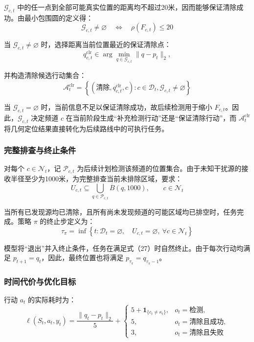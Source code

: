\(\mathcal G_{c,t}\) 中的任一点到全部可能真实位置的距离均不超过20米，因而能够保证清除成功。由最小包围圆的定义得：
\[
\mathcal G_{c,t}\ne\varnothing
\quad\Longleftrightarrow\quad
\rho(F_{c,t})\le20
\]

当 \(\mathcal G_{c,t}\ne\varnothing\) 时，选择距离当前位置最近的保证清除点：
\[
q_{c,t}^{\mathrm{clr}}
\in
\arg\min_{q\in\mathcal G_{c,t}}\|q-p_t\|_2,
\]

并构造清除候选行动集合：
\[
\mathcal A_t^{\mathrm{clr}}
=
\left\{
(\text{清除},q_{c,t}^{\mathrm{clr}},c):
c\in\mathcal D_t,
\mathcal G_{c,t}\ne\varnothing
\right\}
\tag{25}
\]

当 \(\mathcal G_{c,t}=\varnothing\) 时，当前信息不足以保证清除成功，故后续检测用于缩小 \(F_{c,t}\)。因此，\(\mathcal G_{c,t}\) 决定频道 \(c\) 在当前阶段生成``补充检测行动''还是``保证清除行动''，而 \(\mathcal A_t^{\mathrm{clr}}\) 将几何定位结果直接转化为后续路线中的可执行任务。

\subsubsection{完整排查与终止条件}

对每个 \(c\in\mathcal N_t\)，记 \(\mathcal P_{c,t}\) 为后续计划检测该频道的位置集合。由于未知干扰源的接收半径至少为1000米，为完整排查当前未排除区域，要求：
\[
U_{c,t}
\subseteq
\bigcup_{q\in\mathcal P_{c,t}}\overline B(q,1000),
\qquad c\in\mathcal N_t
\tag{26}
\]

当所有已发现源均已清除，且所有尚未发现频道的可能区域均已排空时，任务完成。策略 \(\pi\) 的终止步定义为：
\[
\tau_\pi
=
\inf\left\{
t:\mathcal D_t=\varnothing,
\quad
U_{c,t}=\varnothing,\ \forall c\in\mathcal N_t
\right\}
\tag{27}
\]

模型将``退出''并入终止条件，任务在满足式（27）时自然终止。由于每次行动均满足 \(p_{t+1}=q_t\)，因此，最终位置也将满足 \(p_{\tau_\pi}=q_{\tau_\pi-1}\)。

\subsubsection{时间代价与优化目标}

行动 \(a_t\) 的实际耗时为：
\[
\ell(S_t,a_t,y_t)
=
\frac{\|q_t-p_t\|_2}{5}
+
\begin{cases}
5+\mathbf 1_{\{c_t\ne\kappa_t\}},&o_t=\text{检测},\\[1mm]
5,&o_t=\text{清除且成功},\\[1mm]
3,&o_t=\text{清除且失败}
\end{cases}
\tag{28}
\]

